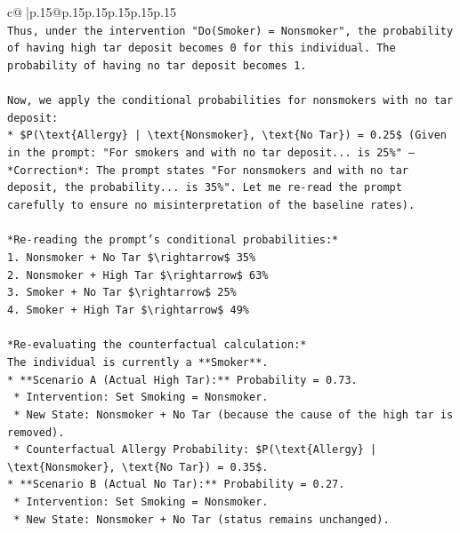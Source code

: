 \documentclass{article}
\begin{document}
{\begin{supertabular}{c@{$\;$}|p{.15\linewidth}@{}p{.15\linewidth}p{.15\linewidth}p{.15\linewidth}p{.15\linewidth}p{.15\linewidth}}
{{{\\ 
\texttt{Thus, under the intervention "Do(Smoker) = Nonsmoker", the probability of having high tar deposit becomes 0 for this individual. The probability of having no tar deposit becomes 1.} \\
\\ 
\texttt{Now, we apply the conditional probabilities for nonsmokers with no tar deposit:} \\
\texttt{*   \$P(\textbackslash{}text\{Allergy\} | \textbackslash{}text\{Nonsmoker\}, \textbackslash{}text\{No Tar\}) = 0.25\$ (Given in the prompt: "For smokers and with no tar deposit... is 25\%" — *Correction*: The prompt states "For nonsmokers and with no tar deposit, the probability... is 35\%". Let me re{-}read the prompt carefully to ensure no misinterpretation of the baseline rates).} \\
\\ 
\texttt{*Re{-}reading the prompt's conditional probabilities:*} \\
\texttt{1.  Nonsmoker + No Tar \$\textbackslash{}rightarrow\$ 35\%} \\
\texttt{2.  Nonsmoker + High Tar \$\textbackslash{}rightarrow\$ 63\%} \\
\texttt{3.  Smoker + No Tar \$\textbackslash{}rightarrow\$ 25\%} \\
\texttt{4.  Smoker + High Tar \$\textbackslash{}rightarrow\$ 49\%} \\
\\ 
\texttt{*Re{-}evaluating the counterfactual calculation:*} \\
\texttt{The individual is currently a **Smoker**.} \\
\texttt{*   **Scenario A (Actual High Tar):** Probability = 0.73.} \\
\texttt{    *   Intervention: Set Smoking = Nonsmoker.} \\
\texttt{    *   New State: Nonsmoker + No Tar (because the cause of the high tar is removed).} \\
\texttt{    *   Counterfactual Allergy Probability: \$P(\textbackslash{}text\{Allergy\} | \textbackslash{}text\{Nonsmoker\}, \textbackslash{}text\{No Tar\}) = 0.35\$.} \\
\texttt{*   **Scenario B (Actual No Tar):** Probability = 0.27.} \\
\texttt{    *   Intervention: Set Smoking = Nonsmoker.} \\
\texttt{    *   New State: Nonsmoker + No Tar (status remains unchanged).} \\
}}}
\end{supertabular}}
\end{document}

